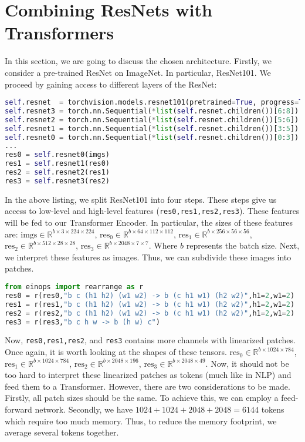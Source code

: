 \section{Combining ResNets with Transformers}\label{sect:architecture}

In this section, we are going to discuss the chosen architecture. Firstly, we consider a pre-trained ResNet on ImageNet. In particular, ResNet101. We proceed by gaining access to different layers of the ResNet:

\begin{lstlisting}[language=Python]
self.resnet  = torchvision.models.resnet101(pretrained=True, progress=True)
self.resnet3 = torch.nn.Sequential(*list(self.resnet.children())[6:8])
self.resnet2 = torch.nn.Sequential(*list(self.resnet.children())[5:6])
self.resnet1 = torch.nn.Sequential(*list(self.resnet.children())[3:5])
self.resnet0 = torch.nn.Sequential(*list(self.resnet.children())[0:3])
...
res0 = self.resnet0(imgs)
res1 = self.resnet1(res0)
res2 = self.resnet2(res1)
res3 = self.resnet3(res2)
\end{lstlisting}

In the above listing, we split ResNet101 into four steps. These steps give us access to low-level and high-level features (\texttt{res0,res1,res2,res3}). These features will be fed to our Transformer Encoder. In particular, the sizes of these features are: $\text{imgs}\in\mathbb{R}^{b\times 3\times 224\times224}$, $\text{res}_0\in\mathbb{R}^{b\times64\times 112 \times 112}$, $\text{res}_1\in\mathbb{R}^{b\times256\times 56\times 56}$, $\text{res}_2\in\mathbb{R}^{b\times512\times 28\times 28}$, $\text{res}_3\in\mathbb{R}^{b\times2048 \times 7\times 7}$. Where $b$ represents the batch size. Next, we interpret these features as images. Thus, we can subdivide these images into patches.

\begin{lstlisting}[language=Python]
from einops import rearrange as r
res0 = r(res0,"b c (h1 h2) (w1 w2) -> b (c h1 w1) (h2 w2)",h1=2,w1=2)
res1 = r(res1,"b c (h1 h2) (w1 w2) -> b (c h1 w1) (h2 w2)",h1=2,w1=2)
res2 = r(res2,"b c (h1 h2) (w1 w2) -> b (c h1 w1) (h2 w2)",h1=2,w1=2)
res3 = r(res3,"b c h w -> b (h w) c")
\end{lstlisting}

Now, \texttt{res0,res1,res2}, and \texttt{res3} contains more channels with linearized patches. Once again, it is worth looking at the shapes of these tensors. $\text{res}_0\in\mathbb{R}^{b\times1024\times784}$, $\text{res}_1\in\mathbb{R}^{b\times1024\times784}$, $\text{res}_2\in\mathbb{R}^{b\times2048\times196}$, $\text{res}_3\in\mathbb{R}^{b\times2048\times49}$. Now, it should not be too hard to interpret these linearized patches as tokens (much like in NLP) and feed them to a Transformer. However, there are two considerations to be made. Firstly, all patch sizes should be the same. To achieve this, we can employ a feed-forward network. Secondly, we have $1024+1024+2048+2048=6144$ tokens which require too much memory. Thus, to reduce the memory footprint, we average several tokens together.

